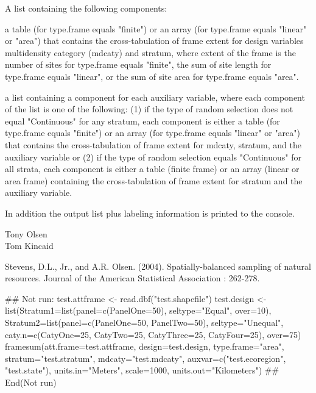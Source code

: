 \begin{Value}
A list containing the following components:
\begin{ldescription}
\item[\code{DesignSize}] a table (for type.frame equals "finite") or an array (for
type.frame equals "linear" or "area") that contains the cross-tabulation of
frame extent for design variables multidensity category (mdcaty) and
stratum, where extent of the frame is the number of sites for type.frame
equals "finite", the sum of site length for type.frame equals "linear", or
the sum of site area for type.frame equals "area".
\item[\code{AuxVarSize}] a list containing a component for each auxiliary variable,
where each component of the list is one of the following: (1) if the type of
random selection does not equal "Continuous" for any stratum, each component
is either a table (for type.frame equals "finite") or an array (for
type.frame equals "linear" or "area") that contains the cross-tabulation of
frame extent for mdcaty, stratum, and the auxiliary variable or (2) if the
type of random selection equals "Continuous" for all strata, each component
is either a table (finite frame) or an array (linear or area frame)
containing the cross-tabulation of frame extent for stratum and the
auxiliary variable.
\end{ldescription}

In addition the output list plus labeling information is printed to the
console.
\end{Value}
\begin{Author}\relax
Tony Olsen \\
Tom Kincaid 
\end{Author}
\begin{References}\relax
Stevens, D.L., Jr., and A.R. Olsen. (2004). Spatially-balanced sampling of
natural resources. Journal of the American Statistical Association :
262-278.
\end{References}
\begin{SeeAlso}\relax
{}
\end{SeeAlso}
\begin{Examples}
\begin{ExampleCode}
## Not run: 
test.attframe <- read.dbf("test.shapefile")
test.design <- list(Stratum1=list(panel=c(PanelOne=50),
   seltype="Equal", over=10), Stratum2=list(panel=c(PanelOne=50,
   PanelTwo=50), seltype="Unequal", caty.n=c(CatyOne=25, CatyTwo=25,
   CatyThree=25, CatyFour=25), over=75)
framesum(att.frame=test.attframe, design=test.design, type.frame="area",
   stratum="test.stratum", mdcaty="test.mdcaty", auxvar=c("test.ecoregion",
   "test.state"), units.in="Meters", scale=1000, units.out="Kilometers")
## End(Not run)
\end{ExampleCode}
\end{Examples}

